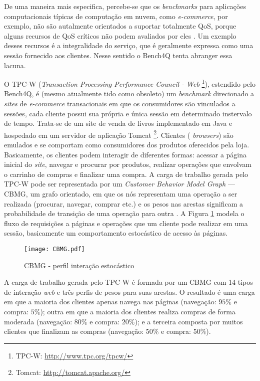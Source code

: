De uma maneira mais especifica, percebe-se que os \textit{benchmarks} para aplicações computacionais típicas de computação em nuvem, como \textit{e-commerce}, por exemplo, não são autalmente orientados a suportar totalmente QoS, porque alguns recursos de QoS críticos não podem avaliados por eles \cite{Zhang2011}. Um exemplo desses recursos é a integralidade do serviço, que é geralmente expressa como uma sessão fornecido aos clientes. Nesse sentido o Bench4Q tenta abranger essa lacuna.


O TPC-W (\textit{Transaction Processing Performance Council - Web} \footnote{TPC-W: \url{http://www.tpc.org/tpcw/}}), estendido pelo Bench4Q, é (mesmo atualmente tido como obsoleto) um \textit{ benchmark} direcionado a \textit{sites} de \textit{e-commerce} transacionais em que os consumidores são vinculados a sessões, cada cliente possui sua própria e única sessão em determinado instervalo de tempo. Trata-se de um site de venda de livros implementado em Java e hospedado em um servidor de aplicação Tomcat \footnote{Tomcat: \url{http://tomcat.apache.org/}}. Clientes (\textit{ browsers}) são emulados e se comportam como consumidores dos produtos oferecidos pela loja. Basicamente, os clientes podem interagir de diferentes formas: acessar a página inicial do \textit{ site}, navegar e procurar por produtos, realizar operações que envolvam o carrinho de compras e finalizar uma compra. A carga de trabalho gerada pelo TPC-W pode ser representada por um \textit{Customer Behavior Model Graph} --- CBMG, um grafo orientado, em que os nós representam uma operação a ser realizada (procurar, navegar, comprar etc.) e os pesos nas arestas significam a probabilidade de transição de uma operação para outra \cite{Zhang2011}. A Figura \ref{fig:CBMG} modela o fluxo de requisições a páginas e operações que um cliente pode realizar em uma sessão, basicamente um comportamento estocástico de acesso às páginas.

\begin{figure}[htb]
	\caption{CBMG - perfil interação estocástico}
	\label{fig:CBMG}
	\centering
	\texttt{[image: CBMG.pdf]}
	\fdireta{}
\end{figure}


A carga de trabalho gerada pelo TPC-W é formada por um CBMG com 14 tipos de interação \textit{web} e três perfis de pesos para suas arestas. O resultado é uma carga em que a maioria dos clientes apenas navega nas páginas (navegação: $95\%$ e compra: $5\%$); outra em que a maioria dos clientes realiza compras de forma moderada (navegação: $80\%$ e compra: $20\%$); e a terceira composta por muitos clientes que finalizam as compras (navegação: $50\%$ e compra: $50\%$). 

